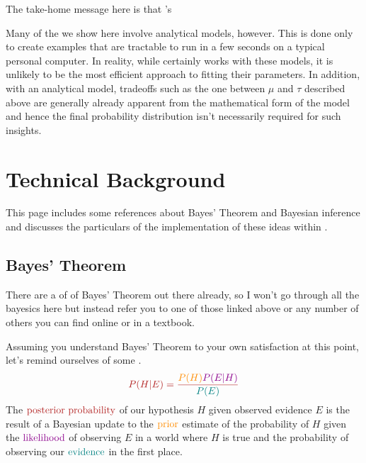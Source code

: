 \documentclass[letterpaper,10pt,english]{sphinxmanual}
\begin{document}
The take-home message here is that ’s 

Many of the {\hyperref[\detokenize{examples::doc}]{}} we show here involve analytical models, however. This is done only to create examples that are tractable to run in a few seconds on a typical personal computer. In reality, while  certainly works with these models, it is unlikely to be the most efficient approach to fitting their parameters. In addition, with an analytical model, tradeoffs such as the one between \(\mu\) and \(\tau\) described above are generally already apparent from the mathematical form of the model and hence the final probability distribution isn’t necessarily required for such insights.


\chapter{Technical Background}
\label{\detokenize{bayesics:technical-background}}\label{\detokenize{bayesics::doc}}
This page includes some references about Bayes’ Theorem and Bayesian inference and discusses the particulars of the implementation of these ideas within .


\section{Bayes’ Theorem}
\label{\detokenize{bayesics:bayes-theorem}}
There are a  of   of Bayes’ Theorem out there already, so I won’t go through all the bayesics here but instead refer you to one of those linked above or any number of others you can find online or in a textbook.

Assuming you understand Bayes’ Theorem to your own satisfaction at this point, let’s remind ourselves of some .
\begin{equation}\label{equation:bayesics:bayesics:0}
\begin{split}\color{firebrick} {P(H|E)} =
\frac{\color{darkorange} {P(H)}
\color{darkmagenta} {P(E|H)}}
{\color{teal} {P(E)}}\end{split}
\end{equation}
The \(\color{firebrick}{\mathbf{\text{posterior probability}}}\) of our hypothesis \(H\) given observed evidence \(E\) is the result of a Bayesian update to the \(\color{darkorange}{\mathbf{\text{prior}}}\) estimate of the probability of \(H\) given the \(\color{darkmagenta}{\mathbf{\text{likelihood}}}\) of observing \(E\) in a world where \(H\) is true and the probability of observing our \(\color{teal}{\mathbf{\text{evidence}}}\) in the first place.
\end{document}
